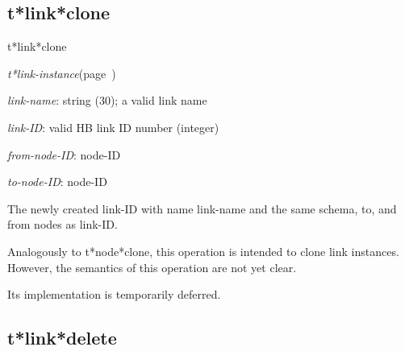 \subsection{t*link*clone}
\label{t*link*clone}

\begin{description}
\item [Name:]  t*link*clone   

\item [Class:] {\sl t*link-instance}\hfill(page~\pageref{t*link-instance})

\item [Parameters:]
\item {\sl link-name}:  string (30); a valid link name

\item {\sl link-ID}:  
valid HB link ID number (integer)

\item {\sl from-node-ID}:  node-ID

\item {\sl to-node-ID}:  node-ID



\item [Return-value:]
The newly created link-ID with name link-name
and the same schema, to, and from nodes as link-ID.

\item [Description:]

Analogously to t*node*clone, this operation is
intended to clone link instances. However, the 
semantics of this operation are not yet clear.

Its implementation is temporarily deferred.

\item [Public:]



\end{description}
\horizontalline

\subsection{t*link*delete}
\label{t*link*delete}

